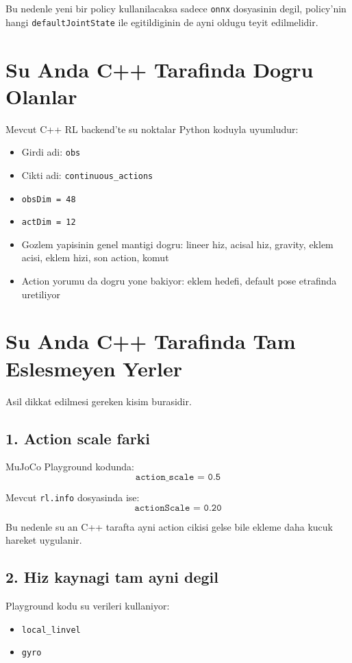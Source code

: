 \documentclass[11pt,a4paper]{article}
\begin{document}
Bu nedenle yeni bir policy kullanilacaksa sadece \texttt{onnx} dosyasinin degil, policy'nin hangi \texttt{defaultJointState} ile egitildiginin de ayni oldugu teyit edilmelidir.

\section*{Su Anda C++ Tarafinda Dogru Olanlar}
Mevcut C++ RL backend'te su noktalar Python koduyla uyumludur:

  \begin{itemize}
  \item Girdi adi: \texttt{obs}
  \item Cikti adi: \texttt{continuous\_actions}
  \item \texttt{obsDim = 48}
  \item \texttt{actDim = 12}
  \item Gozlem yapisinin genel mantigi dogru:
    lineer hiz, acisal hiz, gravity, eklem acisi, eklem hizi, son action, komut
  \item Action yorumu da dogru yone bakiyor:
    eklem hedefi, default pose etrafinda uretiliyor
  \end{itemize}

  \section*{Su Anda C++ Tarafinda Tam Eslesmeyen Yerler}
  Asil dikkat edilmesi gereken kisim burasidir.

  \subsection*{1. Action scale farki}
  MuJoCo Playground kodunda:
  \[
  \texttt{action\_scale = 0.5}
  \]

  Mevcut \texttt{rl.info} dosyasinda ise:
  \[
  \texttt{actionScale = 0.20}
  \]

  Bu nedenle su an C++ tarafta ayni action cikisi gelse bile ekleme daha kucuk hareket uygulanir.

  \subsection*{2. Hiz kaynagi tam ayni degil}
  Playground kodu su verileri kullaniyor:

  \begin{itemize}
  \item \texttt{local\_linvel}
  \item \texttt{gyro}
  \end{itemize}
\end{document}
